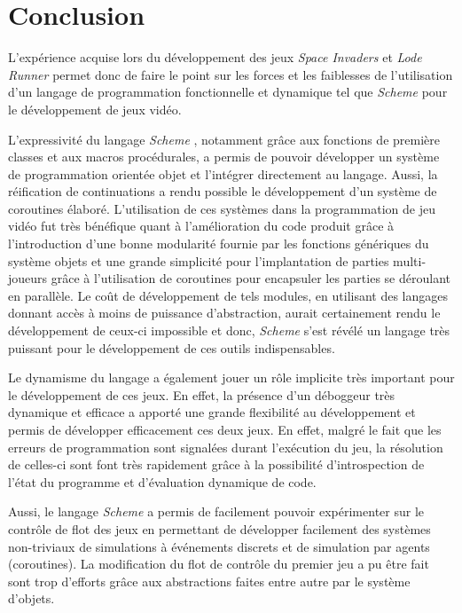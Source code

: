 \documentclass[12pt,twoside,letterpaper,francais]{book}
\newcommand{\lr}{{\textit{Lode Runner }}}
\newcommand{\si}{{\textit{Space Invaders }}}
\newcommand{\Schemelang}{{\textit{Scheme }}}
\begin{document}
\clearpage

\chapter{Conclusion}
L'expérience acquise lors du développement des jeux \si et \lr permet
donc de faire le point sur les forces et les faiblesses de
l'utilisation d'un langage de programmation fonctionnelle et dynamique
tel que \Schemelang pour le développement de jeux vidéo.

L'expressivité du langage \Schemelang, notamment grâce aux fonctions de
première classes et aux macros procédurales, a permis de pouvoir
développer un système de programmation orientée objet et l'intégrer
directement au langage. Aussi, la réification de continuations a rendu
possible le développement d'un système de coroutines élaboré.
L'utilisation de ces systèmes dans la programmation de jeu vidéo fut
très bénéfique quant à l'amélioration du code produit grâce à
l'introduction d'une bonne modularité fournie par les fonctions
génériques du système objets et une grande simplicité pour
l'implantation de parties multi-joueurs grâce à l'utilisation de
coroutines pour encapsuler les parties se déroulant en parallèle. Le
coût de développement de tels modules, en utilisant des langages
donnant accès à moins de puissance d'abstraction, aurait certainement
rendu le développement de ceux-ci impossible et donc, \Schemelang s'est
révélé un langage très puissant pour le développement de ces outils
indispensables.

Le dynamisme du langage a également jouer un rôle implicite très
important pour le développement de ces jeux. En effet, la présence
d'un déboggeur très dynamique et efficace a apporté une grande
flexibilité au développement et permis de développer efficacement ces
deux jeux. En effet, malgré le fait que les erreurs de programmation
sont signalées durant l'exécution du jeu, la résolution de celles-ci
sont font très rapidement grâce à la possibilité d'introspection de
l'état du programme et d'évaluation dynamique de code.

Aussi, le langage \Schemelang a permis de facilement pouvoir expérimenter
sur le contrôle de flot des jeux en permettant de développer
facilement des systèmes non-triviaux de simulations à événements
discrets et de simulation par agents (coroutines). La modification du
flot de contrôle du premier jeu a pu être fait sont trop d'efforts
grâce aux abstractions faites entre autre par le système d'objets.
\end{document}
